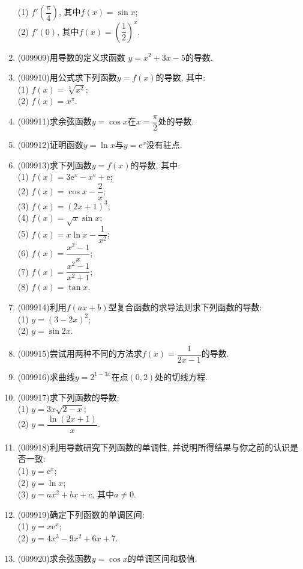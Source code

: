 \documentclass[10pt,a4paper]{article}
\begin{document}
\begin{enumerate}[1.]
(1) $f'(\dfrac\pi 4)$, 其中$f(x)=\sin x$;\\
(2) $f'(0)$, 其中$f(x)=(\dfrac 12)^x$.
\item {\tiny (009909)}用导数的定义求函数 $y=x^2+3x-5$的导数.
\item {\tiny (009910)}用公式求下列函数$y=f(x)$的导数, 其中:\\
(1) $f(x)=\sqrt[3]{x^2}$;\\
(2) $f(x)=x^\pi$.
\item {\tiny (009911)}求余弦函数$y=\cos x$在$x=\dfrac \pi2$处的导数.
\item {\tiny (009912)}证明函数$y=\ln x$与$y=\mathrm{e}^x$没有驻点.
\item {\tiny (009913)}求下列函数$y=f(x)$的导数, 其中:\\
(1) $f(x)=3\mathrm{e}^x-x^{\mathrm{e}}+\mathrm{e}$;\\
(2) $f(x)=\cos x-\dfrac 2x$;\\
(3) $f(x)=(2x+1)^3$;\\
(4) $f(x)=\sqrt x\sin x$;\\
(5) $f(x)=x\ln x-\dfrac1{x^2}$;\\
(6) $f(x)=\dfrac{x^2-1}x$;\\
(7) $f(x)=\dfrac{x^2-1}{x^2+1}$;\\
(8) $f(x)=\tan x$.
\item {\tiny (009914)}利用$f(ax+b)$型复合函数的求导法则求下列函数的导数:\\
(1) $y=(3-2x)^2$;\\
(2) $y=\sin 2x$.
\item {\tiny (009915)}尝试用两种不同的方法求$f(x)=\dfrac1{2x-1}$的导数.
\item {\tiny (009916)}求曲线$y=2^{1-3x}$在点$(0,2)$处的切线方程.
\item {\tiny (009917)}求下列函数的导数:\\
(1) $y=3x \sqrt{2-x}$;\\
(2) $y=\dfrac{\ln(2x+1)}x$.
\item {\tiny (009918)}利用导数研究下列函数的单调性, 并说明所得结果与你之前的认识是否一致:\\
(1) $y=\mathrm{e}^x$;\\
(2) $y=\ln x$;\\
(3) $y=ax^2+bx+c$, 其中$a\ne 0$.
\item {\tiny (009919)}确定下列函数的单调区间:\\
(1) $y=x\mathrm{e}^x$;\\
(2) $y=4x^3-9x^2+6x+7$.
\item {\tiny (009920)}求余弦函数$y=\cos x$的单调区间和极值.

\end{enumerate}
\end{document}
